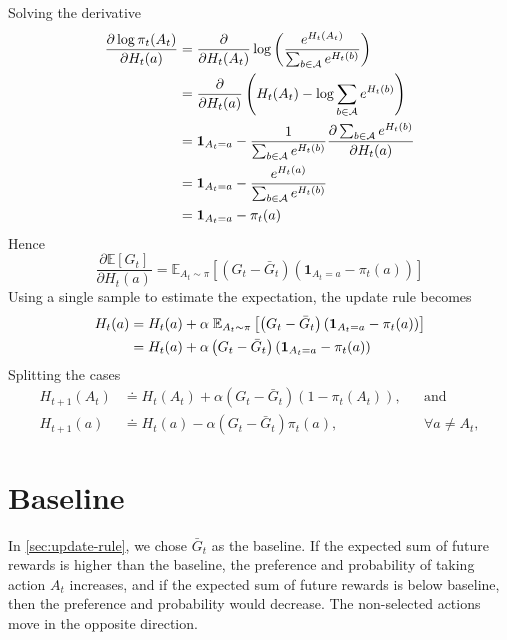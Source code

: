 \documentclass{article}
\begin{document}
Solving the derivative
\begin{align}
    \frac{\partial \log \pi_t(A_t)}{\partial H_t(a)} &=   \frac{\partial}{\partial H_t(A_t)} \log \left( \frac{e^{H_t(A_t)}}{\sum_{b \in \mathcal A}e^{H_t(b)}} \right) \notag\\
    &=  \frac{\partial}{\partial H_t(a)} \left( H_t(A_t) - \log \sum_{b \in \mathcal A}e^{H_t(b)} \right) \notag\\
    &= \mathbf 1_{A_t=a} - \frac{1}{\sum_{b \in \mathcal A}e^{H_t(b)}} \frac{\partial  \sum_{b \in \mathcal A}e^{H_t(b)}}{\partial H_t(a)} \notag\\
    &= \mathbf 1_{A_t=a} - \frac{e^{H_t(a)}}{\sum_{b \in \mathcal A}e^{H_t(b)}} \notag\\
    &= \mathbf 1_{A_t=a} - \pi_t(a)
\end{align}
Hence
\begin{equation}
     \frac{\partial \mathbb E[G_t]}{\partial H_t(a)} = \mathbb E_{A_t \sim \pi} \left[ \left( G_t- \bar G_t \right)\left( \mathbf 1_{A_t=a} - \pi_t(a) \right)\right]
\end{equation}
Using a single sample to estimate the expectation, the update rule becomes
\begin{align}
    H_t(a) &= H_t(a) + \alpha \; \mathbb E_{A_t \sim \pi} \left[ \left( G_t- \bar G_t \right)\left( \mathbf 1_{A_t=a} - \pi_t(a) \right)\right] \notag \\
    &= H_t(a) + \alpha  \left( G_t- \bar G_t \right)\left( \mathbf 1_{A_t=a} - \pi_t(a) \right)
\end{align}
Splitting the cases
\begin{equation}
\begin{aligned}
    H_{t+1}(A_t) &\doteq H_t(A_t) + \alpha(G_t - \bar{G}_t)(1 - \pi_t(A_t)), && \text{and} \\
    H_{t+1}(a) &\doteq H_t(a) - \alpha(G_t - \bar{G}_t)\pi_t(a), && \forall a \neq A_t,
\end{aligned}
\end{equation}

\section{Baseline}
In \autoref{sec:update-rule}, we chose $\bar G_t$ as the baseline. If the expected sum of future rewards is higher than the baseline, the preference and probability of taking action $A_t$ increases, and if the expected sum of future rewards is below baseline, then the preference and probability would decrease. The non-selected actions move in the opposite direction. 
\end{document}
